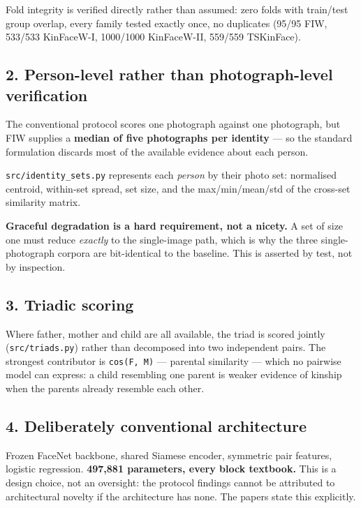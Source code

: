 \documentclass[11pt,a4paper]{article}
\begin{document}
Fold integrity is verified directly rather than assumed: zero folds with
train/test group overlap, every family tested exactly once, no duplicates
(95/95 FIW, 533/533 KinFaceW-I, 1000/1000 KinFaceW-II, 559/559 TSKinFace).

\subsection*{2. Person-level rather than photograph-level verification}

The conventional protocol scores one photograph against one photograph, but FIW
supplies a \textbf{median of five photographs per identity} — so the standard
formulation discards most of the available evidence about each person.

\texttt{src/identity\_sets.py} represents each \emph{person} by their photo set: normalised
centroid, within-set spread, set size, and the max/min/mean/std of the cross-set
similarity matrix.

\textbf{Graceful degradation is a hard requirement, not a nicety.} A set of size one
must reduce \emph{exactly} to the single-image path, which is why the three
single-photograph corpora are bit-identical to the baseline. This is asserted by
test, not by inspection.

\subsection*{3. Triadic scoring}

Where father, mother and child are all available, the triad is scored jointly
(\texttt{src/triads.py}) rather than decomposed into two independent pairs. The
strongest contributor is \texttt{cos(F,~M)} — parental similarity — which no pairwise
model can express: a child resembling one parent is weaker evidence of kinship
when the parents already resemble each other.

\subsection*{4. Deliberately conventional architecture}

Frozen FaceNet backbone, shared Siamese encoder, symmetric pair features,
logistic regression. \textbf{497,881 parameters, every block textbook.} This is a
design choice, not an oversight: the protocol findings cannot be attributed to
architectural novelty if the architecture has none. The papers state this
explicitly.
\end{document}
